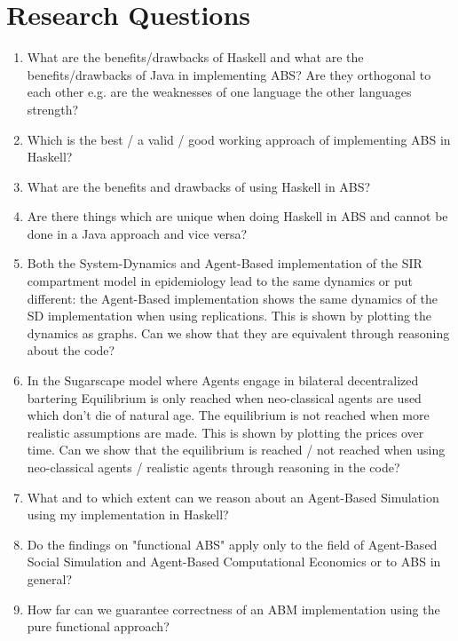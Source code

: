 \section{Research Questions}
\begin{enumerate}
	\item What are the benefits/drawbacks of Haskell and what are the benefits/drawbacks of Java in implementing ABS? Are they orthogonal to each other e.g. are the weaknesses of one language the other languages strength?

	\item Which is the best / a valid / good working approach of implementing ABS in Haskell?
	
	\item What are the benefits and drawbacks of using Haskell in ABS?

	\item Are there things which are unique when doing Haskell in ABS and cannot be done in a Java approach and vice versa?
	
	\item Both the System-Dynamics and Agent-Based implementation of the SIR compartment model in epidemiology lead to the same dynamics or put different: the Agent-Based implementation shows the same dynamics of the SD implementation when using replications. This is shown by plotting the dynamics as graphs. Can we show that they are equivalent through reasoning about the code?
	
	\item In the Sugarscape model where Agents engage in bilateral decentralized bartering Equilibrium is only reached when neo-classical agents are used which don't die of natural age. The equilibrium is not reached when more realistic assumptions are made. This is shown by plotting the prices over time. Can we show that the equilibrium is reached / not reached when using neo-classical agents / realistic agents through reasoning in the code?
	
	\item What and to which extent can we reason about an Agent-Based Simulation using my implementation in Haskell?
	
	\item Do the findings on "functional ABS" apply only to the field of Agent-Based Social Simulation and Agent-Based Computational Economics or to ABS in general?
	
	\item How far can we guarantee correctness of an ABM implementation using the pure functional approach?
\end{enumerate}